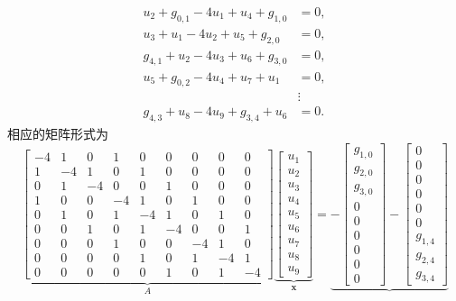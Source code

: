 \[\begin{aligned}
u_2+g_{0,1}-4u_1+u_4+g_{1,0}&=0,\\
u_3+u_1-4u_2+u_5+g_{2,0}&=0,\\
g_{4,1}+u_2-4u_3+u_6+g_{3,0}&=0,\\
u_5+g_{0,2}-4u_4+u_7+u_1&=0,\\
&\vdots\\
g_{4,3}+u_8-4u_9+g_{3,4}+u_6&=0.
\end{aligned}\]
{相应的矩阵形式为}
\begin{equation}\label{eq:laplace-grid-system}
\underbrace{\left[\begin{array}{rrr|rrr|rrr}
-4&1&0&1&0&0&0&0&0\\1&-4&1&0&1&0&0&0&0\\0&1&-4&0&0&1&0&0&0\\\hline
1&0&0&-4&1&0&1&0&0\\0&1&0&1&-4&1&0&1&0\\0&0&1&0&1&-4&0&0&1\\\hline
0&0&0&1&0&0&-4&1&0\\0&0&0&0&1&0&1&-4&1\\0&0&0&0&0&1&0&1&-4
\end{array}\right]}_A
\underbrace{\begin{bmatrix}u_1\\u_2\\u_3\\u_4\\u_5\\u_6\\u_7\\u_8\\u_9\end{bmatrix}}_{\boldsymbol{x}}
=\underbrace{-\begin{bmatrix}g_{1,0}\\g_{2,0}\\g_{3,0}\\0\\0\\0\\0\\0\\0\end{bmatrix}
-\begin{bmatrix}0\\0\\0\\0\\0\\0\\g_{1,4}\\g_{2,4}\\g_{3,4}\end{bmatrix}
}
\end{equation}

